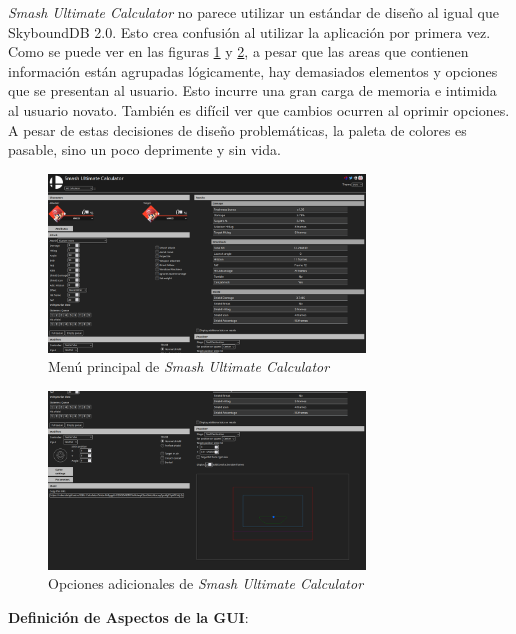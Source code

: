 \newpage

\textit{Smash Ultimate Calculator} no parece utilizar un estándar de diseño al igual que SkyboundDB 2.0. Esto crea confusión al utilizar la aplicación por primera vez. Como se puede ver en las figuras \ref{fig: SUC main menu} y \ref{fig: SUC additional options}, a pesar que las areas que contienen información están agrupadas lógicamente, hay demasiados elementos y opciones que se presentan al usuario. Esto incurre una gran carga de memoria e intimida al usuario novato. También es difícil ver que cambios ocurren al oprimir opciones. A pesar de estas decisiones de diseño problemáticas, la paleta de colores es pasable, sino un poco deprimente y sin vida.

\begin{figure}[ht!]
    \centering
    \includegraphics[width=0.75\textwidth]{figures/SUC1.png}
    \caption{Menú principal de \textit{Smash Ultimate Calculator}}
    \label{fig: SUC main menu}
\end{figure}

\begin{figure}[ht!]
    \centering
    \includegraphics[width=0.75\textwidth]{figures/SUC2.png}
    \caption{Opciones adicionales de \textit{Smash Ultimate Calculator}}
    \label{fig: SUC additional options}
\end{figure}

\newpage

\textbf{Definición de Aspectos de la GUI}: 


